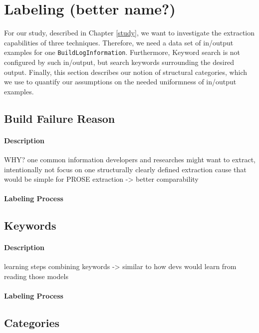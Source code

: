 \documentclass[\myrootdir/main.tex]{subfiles}
\begin{document}
\section{Labeling (better name?)}
For our study, described in Chapter \ref{study}, we want to investigate the extraction capabilities of three techniques. Therefore, we need a data set of in/output examples for one \texttt{BuildLogInformation}. Furthermore, Keyword search is not configured by such in/output, but search keywords surrounding the desired output. Finally, this section describes our notion of structural categories, which we use to quantify our assumptions on the needed uniformness of in/output examples.

  \subsection{Build Failure Reason}

    \paragraph{Description}
    WHY? one common information developers and researches might want to extract, intentionally not focus on one structurally clearly defined extraction   cause that would be simple for PROSE extraction -> better comparability
    \paragraph{Labeling Process}

  \subsection{Keywords}

    \paragraph{Description}
    learning steps combining keywords -> similar to how devs would learn from reading those models

    \paragraph{Labeling Process}

  \subsection{Categories}
\end{document}
